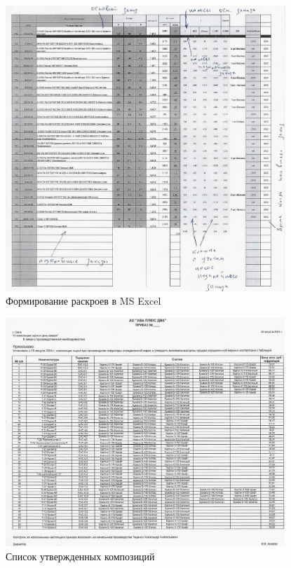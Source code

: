 \begin{figure}
\begin{center}
  \includegraphics[height=0.94\textheight, width=0.94\textwidth, keepaspectratio]{Pics 1/0 Крой в эксель_0001.jpg}
\end{center}
  \caption{Формирование раскроев в MS Excel}
  \label{pic:0 Крой в эксель_0001}
\end{figure}

\begin{figure}
\begin{center}
  \includegraphics[height=0.94\textheight, width=0.94\textwidth, keepaspectratio]{Pics 1/0 Композиции сырья_0001.jpg}
\end{center}
  \caption{Список утвержденных композиций}
  \label{pic:0 Композиции сырья_0001}
\end{figure}

